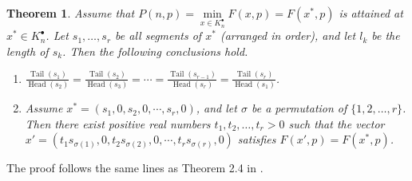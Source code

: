 \documentclass[a4paper,fleqn,numbers]{cas-sc}
\newtheorem{theorem}{Theorem}[section]
\DeclareMathOperator{\Head}{Head}
\DeclareMathOperator{\Tail}{Tail}
\begin{document}
	\begin{theorem}
		Assume that $P(n,p)=\min\limits_{x \in K_n^{\bullet}} F(x,p) = F(x^* ,p)$ is attained at $x^*\in K_n^{\bullet}$. Let $s_1, \ldots, s_r$ be all segments of $x^*$ (arranged in order), and let $l_k$ be the length of $s_k$. Then the following conclusions hold.
		
		\begin{enumerate}
			\item $\frac{\Tail(s_1)}{\Head(s_2)} = \frac{\Tail(s_2)}{\Head(s_3)} = \cdots = \frac{\Tail(s_{r-1})}{\Head(s_r)} = \frac{\Tail(s_r)}{\Head(s_1)}$.
			\item Assume $ x^* = (s_1, 0, s_2, 0, \cdots, s_r, 0) $, and let $\sigma$ be a permutation of $ \{1,2,\dots,r\} $. Then there exist positive real numbers $ t_1, t_2, \dots, t_r > 0 $ such that the vector $ x' = (t_1 s_{\sigma(1)}, 0, t_2 s_{\sigma(2)}, 0, \cdots, t_r s_{\sigma(r)}, 0) $ satisfies $F(x',p) = F(x^*,p) $.
		\end{enumerate}
	\end{theorem}
	
	The proof follows the same lines as Theorem 2.4 in \cite{ando2013}.
	
\end{document}
